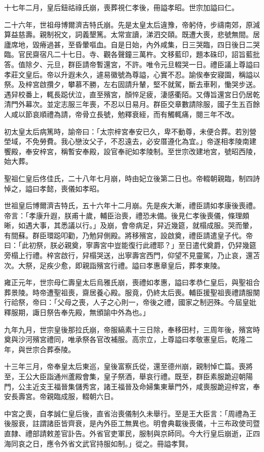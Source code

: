 \begin{pinyinscope}
十七年二月，皇后鈕祜祿氏崩，喪葬視仁孝後，冊謚孝昭。世宗加謚曰仁。

二十六年，世祖母博爾濟吉特氏崩。先是太皇太后違豫，帝躬侍，步禱南郊，原減算益慈壽。親制祝文，詞義墾篤。太常宣讀，涕泗交頤。既遭大喪，悲號無間。居廬席地，毀瘠過甚，至昏暈嘔血。自是日始，內外咸集，日三哭臨，四日後日二哭臨。官民齋宿凡二十七日。寺、觀各聲鐘三萬杵。文移藍印，題本硃印，詔旨藍批答。值除夕、元旦，群臣請帝暫還宮，不許。唯令元旦輟哭一日。禮臣議上尊謚曰孝莊文皇后。帝以升遐未久，遽易徽號為尊謚，心實不忍。諭俟奉安寢園，稱謚以祭。及梓宮啟攢夕，攀慕不勝，左右固請升輦，堅不就駕，斷去車靷，慟哭步送。遇舁校番上，輒長跽伏泣，直至殯宮，顏悴足疲，淒感衢陌。又傳旨還宮日仍居乾清門外幕次。並定志服三年喪，不忍以日易月。群臣交章數請除服，國子生五百餘人咸以節哀順禮為請，帝骨立長號，勉釋衰絰，而有觸輒痛，閱三年不改。

初太皇太后病篤時，諭帝曰：「太宗梓宮奉安已久，卑不動尊，未便合葬。若別營塋域，不免勞費。我心戀汝父子，不忍遠去，必安厝遵化為宜。」帝遂相孝陵南建饗殿，奉安梓宮，稱暫安奉殿，設官奉祀如孝陵制。至世宗改建地宮，號昭西陵，始大葬。

聖祖仁皇后佟佳氏，二十八年七月崩，時由妃立後第二日也。帝輟朝親臨，制四詩悼之，謚曰孝懿，喪儀如孝昭。

世祖皇后博爾濟吉特氏，五十六年十二月崩。先是疾大漸，禮臣請如孝康後喪禮。帝言：「孝康升遐，朕甫十歲，輔臣治喪，禮恐未備。後見仁孝後喪儀，條理頗晰，如遇大事，其悉議以行。」及崩，會帝病足，舁近幾筵，就榻成服。哭而暈，有間蘇。群臣環跽叩勸，乃勉舁側殿。將移殯宮，設啟奠，禮臣請遣皇子代。帝曰：「此初祭，朕必親奠，寧壽宮中豈能復行此禮耶？」至日遣代奠爵，仍舁幾筵旁榻上行禮。梓宮啟行，舁榻哭送，出寧壽宮西門，仰望不見靈駕，乃止哀，還苫次。大祭，足疾少愈，即親詣殯宮行禮。謚曰孝惠章皇后，葬孝東陵。

雍正元年，世宗母仁壽皇太后烏雅氏崩，喪禮如孝惠，謚曰孝恭仁皇后，與聖祖合葬景陵。時帝遭聖祖喪，齋居養心殿。服竟，仍終太后喪。輔臣援聖祖喪禮請服闋行祫祭，帝曰：「父母之喪，人子之心則一，帝後之禮，國家之制迥殊。今屆皇妣釋服期，諏日祭告奉先殿，無頒諭中外為也。」

九年九月，世宗皇後那拉氏崩，帝服縞素十三日除，奉移田村，三周年後，殯宮時奠與沙河殯宮禮同，唯承祭各官改補服。高宗立，上尊謚曰孝敬憲皇后。乾隆二年，與世宗合葬泰陵。

十三年三月，帝奉皇太后東巡，皇後富察氏從，還至德州崩，親制悼亡篇。喪將至，王公大臣詣通州蘆殿會集，皇子祭酒，舉哀行禮。既至，群臣素服跪迎朝陽門，公主近支王福晉集儲秀宮，諸王福晉及命婦集東華門外，咸喪服跪迎梓宮，奉安長壽宮。帝親臨成服，輟朝六日。

中宮之喪，自孝誠仁皇后後，直省治喪儀制久未舉行。至是王大臣言：「周禮為王後服衰，註謂諸臣皆齊衰，是內外臣工無異也。明會典載後喪儀，十三布政使司暨直隸、禮部請敕差官訃告。外省官吏軍民，服制與京師同。今大行皇后崩逝，正四海同哀之日，應令外省文武官持服如制。」從之。冊謚孝賢。


\end{pinyinscope}
